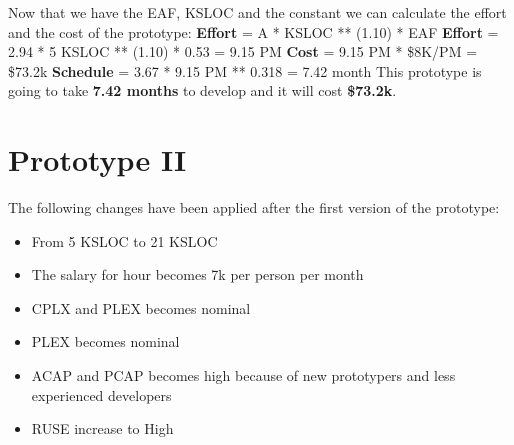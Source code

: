 \pagebreak
\noindent
Now that we have the EAF, KSLOC and the constant we can calculate the effort and the cost of the prototype: \newline\newline
\textbf{Effort} = A * KSLOC ** (1.10) * EAF \newline
\textbf{Effort} = 2.94 * 5 KSLOC ** (1.10) * 0.53 = 9.15 PM \newline\newline
\textbf{Cost} = 9.15 PM * \$8K/PM = \$73.2k\newline\newline
\textbf{Schedule} = 3.67 * 9.15 PM ** 0.318 = 7.42 month\newline\newline
\noindent
This prototype is going to take \textbf{7.42 months} to develop and it will cost \textbf{\$73.2k}.

\pagebreak

\section{Prototype II}
The following changes have been applied after the first version of the prototype:
\begin{itemize}
    \item From 5 KSLOC to 21 KSLOC
    \item The salary for hour becomes 7k per person per month
    \item CPLX and PLEX becomes nominal
    \item PLEX becomes nominal
    \item ACAP and PCAP becomes high because of new prototypers and less experienced developers 
    \item RUSE increase to High
\end{itemize}

